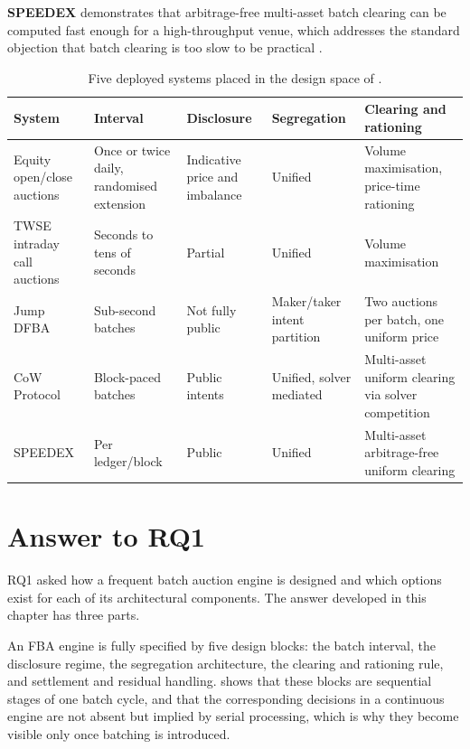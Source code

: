 \textbf{SPEEDEX} demonstrates that arbitrage-free multi-asset batch
clearing can be computed fast enough for a high-throughput venue, which
addresses the standard objection that batch clearing is too slow to be
practical \citep{ramsay2023speedex}.

\begin{table}[htbp]
\centering
\caption[Deployed batch auction systems in the design space]{Five
deployed systems placed in the design space of .}
\label{tab:casestudies}
\small
\begin{tabularx}{\textwidth}{@{}p{2.6cm} p{2.0cm} p{2.4cm} p{2.3cm} L@{}}
\toprule
\textbf{System} & \textbf{Interval} & \textbf{Disclosure} &
\textbf{Segregation} & \textbf{Clearing and rationing}\\
\midrule
Equity open/close auctions & Once or twice daily, randomised extension &
Indicative price and imbalance & Unified & Volume maximisation,
price-time rationing\\
TWSE intraday call auctions & Seconds to tens of seconds & Partial &
Unified & Volume maximisation\\
Jump DFBA & Sub-second batches & Not fully public & Maker/taker intent
partition & Two auctions per batch, one uniform price\\
CoW Protocol & Block-paced batches & Public intents & Unified, solver
mediated & Multi-asset uniform clearing via solver competition\\
SPEEDEX & Per ledger/block & Public & Unified & Multi-asset
arbitrage-free uniform clearing\\
\bottomrule
\end{tabularx}
\end{table}

\section{Answer to RQ1}
\label{sec:rq1answer}

RQ1 asked how a frequent batch auction engine is designed and which
options exist for each of its architectural components. The answer
developed in this chapter has three parts.

An FBA engine is fully specified by five design blocks: the batch
interval, the disclosure regime, the segregation architecture, the
clearing and rationing rule, and settlement and residual handling.
 shows that these blocks are sequential stages of one
batch cycle, and that the corresponding decisions in a continuous engine
are not absent but implied by serial processing, which is why they
become visible only once batching is introduced.

